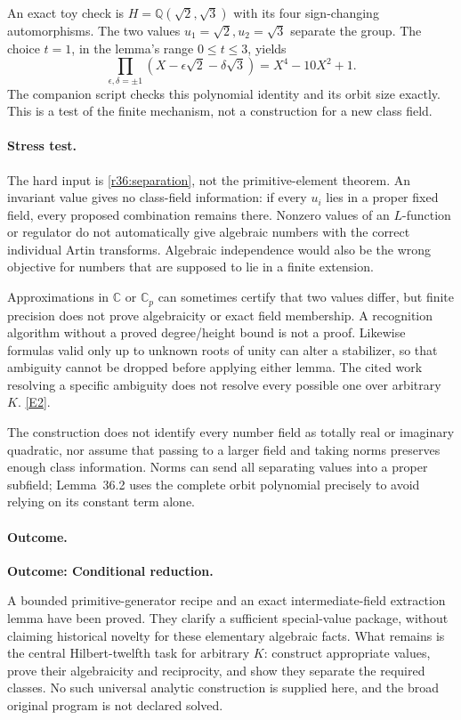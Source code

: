 \documentclass[11pt,a4paper]{article}
\newcommand{\Q}{\mathbb{Q}}
\newcommand{\C}{\mathbb{C}}
\newcommand{\eref}[2]{\hyperlink{extra:#1:#2}{[E#2]}}
\numberwithin{equation}{section}
\begin{document}
An exact toy check is $H=\Q(\sqrt2,\sqrt3)$ with its four sign-changing
automorphisms. The two values $u_1=\sqrt2,u_2=\sqrt3$ separate the group.
The choice $t=1$, in the lemma's range $0\le t\le3$, yields
\[
 \prod_{\epsilon,\delta=\pm1}
 (X-\epsilon\sqrt2-\delta\sqrt3)=X^4-10X^2+1.
\]
The companion script checks this polynomial identity and its orbit size
exactly. This is a test of the finite mechanism, not a construction for a
new class field.

\paragraph{Stress test.}
The hard input is \eqref{r36:separation}, not the primitive-element theorem.
An invariant value gives no class-field information: if every $u_i$ lies in
a proper fixed field, every proposed combination remains there. Nonzero
values of an $L$-function or regulator do not automatically give algebraic
numbers with the correct individual Artin transforms. Algebraic independence
would also be the wrong objective for numbers that are supposed to lie in a
finite extension.

Approximations in $\C$ or $\C_p$ can sometimes certify that two values differ,
but finite precision does not prove algebraicity or exact field membership.
A recognition algorithm without a proved degree/height bound is not a proof.
Likewise formulas valid only up to unknown roots of unity can alter a
stabilizer, so that ambiguity cannot be dropped before applying either lemma.
The cited work resolving a specific ambiguity does not resolve every possible
one over arbitrary $K$. \eref{statement}{2}.

The construction does not identify every number field as totally real or
imaginary quadratic, nor assume that passing to a larger field and taking
norms preserves enough class information. Norms can send all separating
values into a proper subfield; Lemma~36.2 uses the complete orbit polynomial
precisely to avoid relying on its constant term alone.

\paragraph{Outcome.}
\textbf{Outcome: Conditional reduction.}

A bounded primitive-generator recipe and an exact intermediate-field extraction
lemma have been proved. They clarify a sufficient special-value package,
without claiming historical novelty for these elementary algebraic facts.
What remains is the central Hilbert-twelfth task for arbitrary $K$: construct
appropriate values, prove their algebraicity and reciprocity, and show they
separate the required classes. No such universal analytic construction is
supplied here, and the broad original program is not declared solved.
\end{document}
